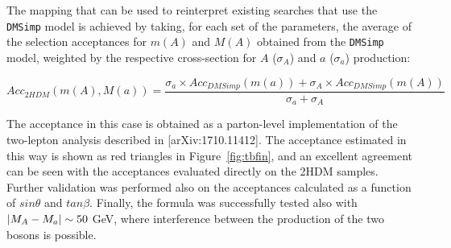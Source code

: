 


The mapping that can be used to reinterpret existing searches that use the \texttt{DMSimp} model is achieved by taking, for each set of the parameters, the average of the selection acceptances for $m(A)$ and $M(A)$ obtained from the \texttt{DMSimp} model, weighted by the respective cross-section for $A$ ($\sigma_A$) and $a$ ($\sigma_a$) production: 

\begin{equation}
Acc_{2HDM}(m(A),M(a))=\frac{\sigma_a \times Acc_{DMSimp}(m(a))+
\sigma_A \times Acc_{DMSimp}(m(A))}{\sigma_a+\sigma_A}
\label{eq:rew}
\end{equation}

The acceptance in this case is obtained as a parton-level implementation of the two-lepton analysis described in [arXiv:1710.11412].
The acceptance estimated in this way is shown as red triangles in Figure~\ref{fig:tbfin}, and an excellent agreement can be seen with the acceptances evaluated directly on the 2HDM samples. 
Further validation was performed also on the acceptances calculated as a function of $sin\theta$ and $tan\beta$.
Finally, the formula was successfully tested also with $|M_{A}-M_{a}| \sim 50$ GeV, where interference between the production of the two bosons is possible.

